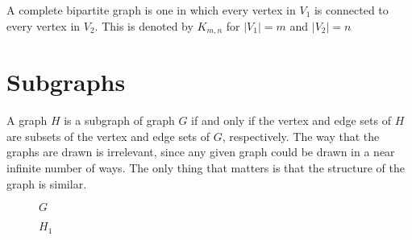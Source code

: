 A complete bipartite graph is one in which every vertex in $V_1$ is connected to every vertex in $V_2$. This is denoted
 by $K_{m, n}$ for $\lvert V_1 \rvert = m$ and $\lvert V_2 \rvert = n$

\section*{Subgraphs}

A graph $H$ is a subgraph of graph $G$ if and only if the vertex and edge sets of $H$ are subsets of the vertex and edge
 sets of $G$, respectively. The way that the graphs are drawn is irrelevant, since any given graph could be drawn in a
 near infinite number of ways. The only thing that matters is that the structure of the graph is similar.

\begin{minipage}[c]{0.3\linewidth}
  \begin{figure}[H]
    \centering
    \usetikzlibrary{graphs}
    \caption{$G$}
    \label{fig:graph5}
  \end{figure}
\end{minipage}\hfill
\begin{minipage}[c]{0.3\linewidth}
  \begin{figure}[H]
    \centering
    \usetikzlibrary{graphs}
    \caption{$H_1$}
    \label{fig:graph6}
  \end{figure}
\end{minipage}\hfill
